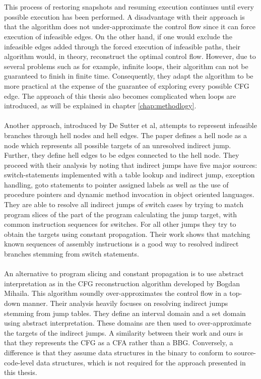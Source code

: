 \documentclass{kththesis}
\begin{document}
\\ \\
This process of restoring snapshots and resuming execution continues until every possible execution has been performed. A disadvantage with their approach is that the algorithm does not under-approximate the control flow since it can force execution of infeasible edges. On the other hand, if one would exclude the infeasible edges added through the forced execution of infeasible paths, their algorithm would, in theory, reconstruct the optimal control flow. However, due to several problems such as for example, infinite loops, their algorithm can not be guaranteed to finish in finite time. Consequently, they adapt the algorithm to be more practical at the expense of the guarantee of exploring every possible CFG edge. The approach of this thesis also becomes complicated when loops are introduced, as will be explained in chapter \ref{chap:methodlogy}.
\\ \\
Another approach, introduced by De Sutter et al\cite{staticOfInd}, attempts to represent infeasible branches through hell nodes and hell edges. The paper defines a hell node as a node which represents all possible targets of an unresolved indirect jump. Further, they define hell edges to be edges connected to the hell node. They proceed with their analysis by noting that indirect jumps have five major sources: switch-statements implemented with a table lookup and indirect jump, exception handling, goto statements to pointer assigned labels as well as the use of procedure pointers and dynamic method invocation in object oriented languages. They are able to resolve all indirect jumps of switch cases by trying to match program slices of the part of the program calculating the jump target, with common instruction sequences for switches. For all other jumps they try to obtain the targets using constant propagation. Their work shows that matching known sequences of assembly instructions is a good way to resolved indirect branches stemming from switch statements. 
\\ \\
An alternative to program slicing and constant propagation is to use abstract interpretation as in the CFG reconstruction algorithm developed by Bogdan Mihaila\parencite{CFGFromPowerPC}. This algorithm soundly over-approximates the control flow in a top-down manner. Their analysis heavily focuses on resolving indirect jumps stemming from jump tables. They define an interval domain and a set domain using abstract interpretation. These domains are then used to over-approximate the targets of the indirect jumps. A similarity between their work and ours is that they represents the CFG as a CFA rather than a BBG. Conversely, a difference is that they assume data structures in the binary to conform to source-code-level data structures, which is not required for the approach presented in this thesis. 
\end{document}
